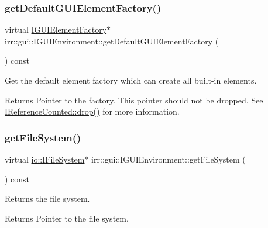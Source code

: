 \subsubsection{\texorpdfstring{get\+Default\+G\+U\+I\+Element\+Factory()}{getDefaultGUIElementFactory()}}
{\footnotesize\ttfamily virtual \hyperlink{classirr_1_1gui_1_1IGUIElementFactory}{I\+G\+U\+I\+Element\+Factory}$\ast$ irr\+::gui\+::\+I\+G\+U\+I\+Environment\+::get\+Default\+G\+U\+I\+Element\+Factory (\begin{DoxyParamCaption}{ }\end{DoxyParamCaption}) const\hspace{0.3cm}{\ttfamily [pure virtual]}}



Get the default element factory which can create all built-\/in elements. 

\begin{DoxyReturn}{Returns}
Pointer to the factory. This pointer should not be dropped. See \hyperlink{classirr_1_1IReferenceCounted_a03856a09355b89d178090c4a5f738543}{I\+Reference\+Counted\+::drop()} for more information. 
\end{DoxyReturn}
\mbox{\label{classirr_1_1gui_1_1IGUIEnvironment_ad3ae4570702000e09cacdb663f0ec363}} 
\subsubsection{\texorpdfstring{get\+File\+System()}{getFileSystem()}}
{\footnotesize\ttfamily virtual \hyperlink{classirr_1_1io_1_1IFileSystem}{io\+::\+I\+File\+System}$\ast$ irr\+::gui\+::\+I\+G\+U\+I\+Environment\+::get\+File\+System (\begin{DoxyParamCaption}{ }\end{DoxyParamCaption}) const\hspace{0.3cm}{\ttfamily [pure virtual]}}



Returns the file system. 

\begin{DoxyReturn}{Returns}
Pointer to the file system. 
\end{DoxyReturn}
\mbox{\label{classirr_1_1gui_1_1IGUIEnvironment_a624c047cb88a5d3e3e0d17a42a627335}} 
